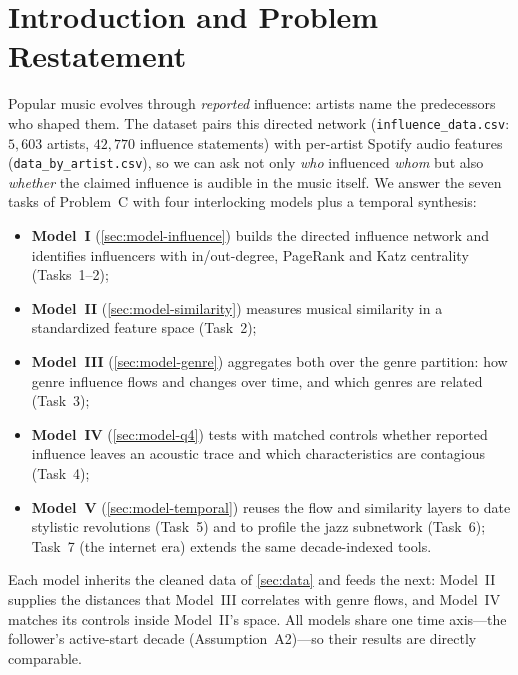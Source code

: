 \documentclass[11pt,letterpaper]{article}
\numberwithin{equation}{section}
\begin{document}
\section{Introduction and Problem Restatement}\label{sec:intro}

Popular music evolves through \emph{reported} influence: artists name the
predecessors who shaped them. The dataset pairs this directed network
(\texttt{influence\_data.csv}: $5{,}603$ artists, $42{,}770$ influence
statements) with per-artist Spotify audio features
(\texttt{data\_by\_artist.csv}), so we can ask not only \emph{who}
influenced \emph{whom} but also \emph{whether} the claimed influence is
audible in the music itself. We answer the seven tasks of Problem~C with
four interlocking models plus a temporal synthesis:

\begin{itemize}[leftmargin=1.9em,itemsep=1pt]
  \item \textbf{Model~I} (\cref{sec:model-influence}) builds the directed
        influence network and identifies influencers with in/out-degree,
        PageRank and Katz centrality (Tasks~1--2);
  \item \textbf{Model~II} (\cref{sec:model-similarity}) measures musical
        similarity in a standardized feature space (Task~2);
  \item \textbf{Model~III} (\cref{sec:model-genre}) aggregates both over
        the genre partition: how genre influence flows and changes over
        time, and which genres are related (Task~3);
  \item \textbf{Model~IV} (\cref{sec:model-q4}) tests with matched controls
        whether reported influence leaves an acoustic trace and which
        characteristics are contagious (Task~4);
  \item \textbf{Model~V} (\cref{sec:model-temporal}) reuses the flow and
        similarity layers to date stylistic revolutions (Task~5) and to
        profile the jazz subnetwork (Task~6); Task~7 (the internet era)
        extends the same decade-indexed tools.
\end{itemize}

Each model inherits the cleaned data of \cref{sec:data} and feeds the
next: Model~II supplies the distances that Model~III correlates with
genre flows, and Model~IV matches its controls inside Model~II's space.
All models share one time axis---the follower's active-start decade
(Assumption~A2)---so their results are directly comparable.
\end{document}

